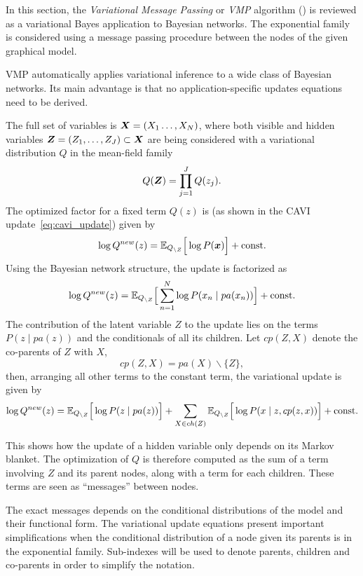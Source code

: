 
In this section, the \emph{Variational Message Passing} or \emph{VMP} algorithm (\cite{winn2005variational, bishop2003vibes}) is reviewed as a variational Bayes application to Bayesian networks. The exponential family is considered using a message passing procedure between the nodes of the given graphical model.

VMP automatically applies variational inference to a wide class of Bayesian networks. Its main advantage is that no application-specific updates equations need to be derived.

The full set of variables is \( \bm{X} = (X_1\dots,X_N) \), where both visible and hidden variables \( \bm{Z} = (Z_1,\dots,Z_J) \subset \bm{X}\) are being considered with a variational distribution \( Q \) in the mean-field family
\[
   Q(\bm{Z}) = \prod_{j=1}^J Q(z_j).
\]
The optimized factor for a fixed term \(Q(z)\) is (as shown in the CAVI update~\ref{eq:cavi_update}) given by
\begin{equation}\label{eq:vmp_update}
   \log Q^{new}(z) = \mathbb{E}_{Q_{\backslash Z}}\Big[\log P(\bm{x})\Big] + \text{const.}
\end{equation}
Using the Bayesian network structure, the update is factorized as
\[
  \log Q^{new}(z) = \mathbb{E}_{Q_{\backslash Z}}\Big[ \sum_{n=1}^N \log P(x_n \mid pa(x_n))\Big] + \text{const.}
\]
The contribution of the latent variable \(Z\) to the update lies on the terms \( P(z \mid pa(z)) \) and the conditionals of all its children. Let \(cp(Z,X)\) denote the co-parents of \(Z\) with \(X\),
\[
  cp(Z,X) = pa(X)\backslash \{Z\},
\]
then, arranging all other terms to the constant term, the variational update is given by
\begin{equation}\label{eq:vmp_update_open}
   \log Q^{new}(z) = \mathbb{E}_{Q_{\backslash Z}}\Big[\log P(z \mid pa(z))\Big] + \sum_{X \in ch(Z)} \mathbb{E}_{Q_{\backslash Z}}\Big[\log P(x \mid z,cp(z, x))\Big] + \text{const.}
\end{equation}

This shows how the update of a hidden variable only depends on its Markov blanket. The optimization of \( Q \) is therefore computed as the sum of a term involving \( Z \) and its parent nodes, along with a term for each children. These terms are seen as ``messages'' between nodes.

The exact messages depends on the conditional distributions of the model and their functional form. The variational update equations present important simplifications when the conditional distribution of a node given its parents is in the exponential family. Sub-indexes will be used to denote parents, children and co-parents in order to simplify the notation.

